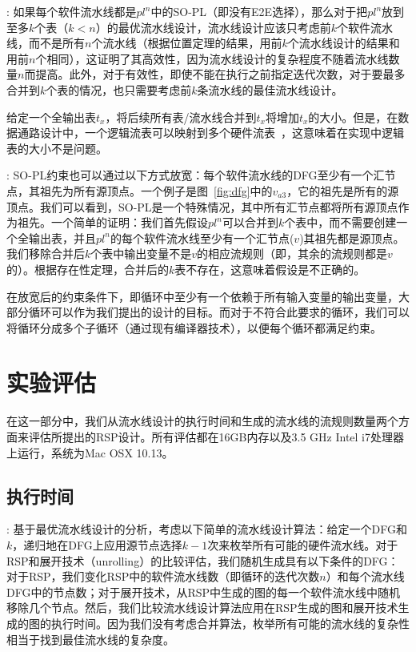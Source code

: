 : 如果每个软件流水线都是$pl^n$中的SO-PL（即没有E2E选择），那么对于把$pl^n$放到至多$k$个表（$k < n$）的最优流水线设计，流水线设计应该只考虑前$k$个软件流水线，而不是所有$n$个流水线（根据位置定理的结果，用前$k$个流水线设计的结果和用前$n$个相同），这证明了其高效性，因为流水线设计的复杂程度不随着流水线数量$n$而提高。此外，对于有效性，即使不能在执行之前指定迭代次数，对于要最多合并到$k$个表的情况，也只需要考虑前$k$条流水线的最佳流水线设计。 

给定一个全输出表$t_x$，将后续所有表/流水线合并到$t_x$将增加$t_x$的大小。但是，在数据通路设计中，一个逻辑流表可以映射到多个硬件流表~\cite{rmt}，这意味着在实现中逻辑表的大小不是问题。

: SO-PL约束也可以通过以下方式放宽：每个软件流水线的DFG至少有一个汇节点，其祖先为所有源顶点。一个例子是图~\ref{fig:dfg}中的$v_{a3}$，它的祖先是所有的源顶点。我们可以看到，SO-PL是一个特殊情况，其中所有汇节点都将所有源顶点作为祖先。一个简单的证明：我们首先假设$pl^n$可以合并到$k$个表中，而不需要创建一个全输出表，并且$pl^n$的每个软件流水线至少有一个汇节点($v$)其祖先都是源顶点。我们移除合并后$k$个表中输出变量不是$v$的相应流规则（即，其余的流规则都是$v$的）。根据存在性定理，合并后的$k$表不存在，这意味着假设是不正确的。

在放宽后的约束条件下，即循环中至少有一个依赖于所有输入变量的输出变量，大部分循环可以作为我们提出的设计的目标。而对于不符合此要求的循环，我们可以将循环分成多个子循环（通过现有编译器技术），以便每个循环都满足约束。


\section{实验评估}
\label{sec:eval}

在这一部分中，我们从流水线设计的执行时间和生成的流水线的流规则数量两个方面来评估所提出的RSP设计。所有评估都在16GB内存以及3.5 GHz Intel i7处理器上运行，系统为Mac OSX 10.13。

\subsection{执行时间}
: 基于最优流水线设计的分析，考虑以下简单的流水线设计算法：给定一个DFG和$k$，递归地在DFG上应用源节点选择$k-1$次来枚举所有可能的硬件流水线。对于RSP和展开技术（unrolling）的比较评估，我们随机生成具有以下条件的DFG：对于RSP，我们变化RSP中的软件流水线数（即循环的迭代次数$n$）和每个流水线DFG中的节点数；对于展开技术，从RSP中生成的图的每一个软件流水线中随机移除几个节点。然后，我们比较流水线设计算法应用在RSP生成的图和展开技术生成的图的执行时间。因为我们没有考虑合并算法，枚举所有可能的流水线的复杂性相当于找到最佳流水线的复杂度。


